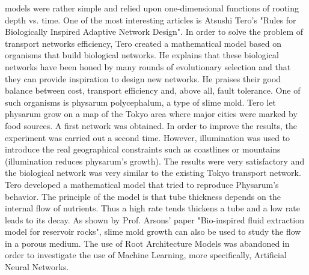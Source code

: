 models were rather simple and relied upon one-dimensional functions of rooting depth vs.
time.
\bigbreak
One of the most interesting articles is Atsushi Tero’s "Rules for Biologically Inspired
Adaptive Network Design". In order to solve the problem of transport networks efficiency,
Tero created a mathematical model based on organisms that build biological networks. He
explains that these biological networks have been honed by many rounds of evolutionary
selection and that they can provide inspiration to design new networks. He praises their
good balance between cost, transport efficiency and, above all, fault tolerance. One of
such organisms is physarum polycephalum, a type of slime mold. Tero let physarum
grow on a map of the Tokyo area where major cities were marked by food sources. A
first network was obtained. In order to improve the results, the experiment was carried
out a second time. However, illumination was used to introduce the real geographical
constraints such as coastlines or mountains (illumination reduces physarum’s growth). The
results were very satisfactory and the biological network was very similar to the existing
Tokyo transport network. Tero developed a mathematical model that tried to reproduce
Physarum’s behavior. The principle of the model is that tube thickness depends on the
internal flow of nutrients. Thus a high rate tends thickens a tube and a low rate leads
to its decay. As shown by Prof. Arsons’ paper "Bio-inspired fluid extraction model for
reservoir rocks", slime mold growth can also be used to study the flow in a porous medium.
The use of Root Architecture Models was abandoned in order to investigate the use of Machine Learning,
 more specifically, Artificial Neural Networks.

